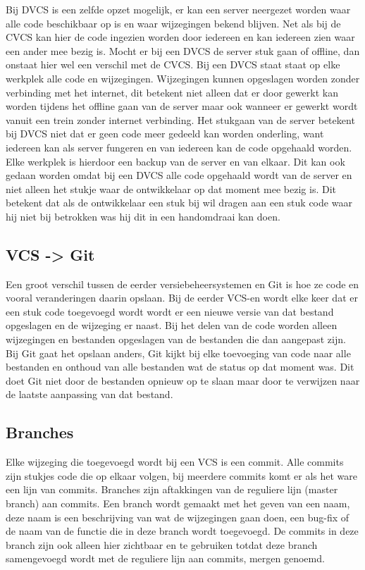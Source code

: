 \documentclass[a4paper,11pt,oneside]{report}
\begin{document}
Bij DVCS is een zelfde opzet mogelijk, er kan een server neergezet worden waar
alle code beschikbaar op is en waar wijzegingen bekend blijven. Net als bij de
CVCS kan hier de code ingezien worden door iedereen en kan iedereen zien waar
een ander mee bezig is. Mocht er bij een DVCS de server stuk gaan of offline,
dan onstaat hier wel een verschil met de CVCS. Bij een DVCS staat staat op elke
werkplek alle code en wijzegingen. Wijzegingen kunnen opgeslagen worden zonder
verbinding met het internet, dit betekent niet alleen dat er door gewerkt kan
worden tijdens het offline gaan van de server maar ook wanneer er gewerkt wordt
vanuit een trein zonder internet verbinding. Het stukgaan van de server betekent
bij DVCS niet dat er geen code meer gedeeld kan worden onderling, want iedereen
kan als server fungeren en van iedereen kan de code opgehaald worden. Elke
werkplek is hierdoor een backup van de server en van elkaar.
Dit kan ook gedaan worden omdat bij een DVCS alle code opgehaald wordt van de
server en niet alleen het stukje waar de ontwikkelaar op dat moment mee bezig
is. Dit betekent dat als de ontwikkelaar een stuk bij wil dragen aan een stuk
code waar hij niet bij betrokken was hij dit in een handomdraai kan doen.


\subsection{VCS -> Git}
Een groot verschil tussen de eerder versiebeheersystemen en Git is hoe ze code
en vooral veranderingen daarin opslaan. Bij de eerder VCS-en wordt elke keer dat
er een stuk code toegevoegd wordt wordt er een nieuwe versie van dat bestand
opgeslagen en de wijzeging er naast. Bij het delen van de code worden alleen
wijzegingen en bestanden opgeslagen van de bestanden die dan aangepast zijn. Bij
Git gaat het opslaan anders, Git kijkt bij elke toevoeging van code naar alle
bestanden en onthoud van alle bestanden wat de status op dat moment was. Dit
doet Git niet door de bestanden opnieuw op te slaan maar door te verwijzen naar
de laatste aanpassing van dat bestand.

\subsection{Branches}
Elke wijzeging die toegevoegd wordt bij een VCS is een commit. Alle commits zijn
stukjes code die op elkaar volgen, bij meerdere commits komt er als het ware een
lijn van commits. Branches zijn aftakkingen van de reguliere lijn (master
branch) aan commits. Een branch wordt gemaakt met het geven van een naam, deze
naam is een beschrijving van wat de wijzegingen gaan doen, een bug-fix of de
naam van de functie die in deze branch wordt toegevoegd. De commits in deze
branch zijn ook alleen hier zichtbaar en te gebruiken totdat deze branch
samengevoegd wordt met de reguliere lijn aan commits, mergen genoemd.
\end{document}
